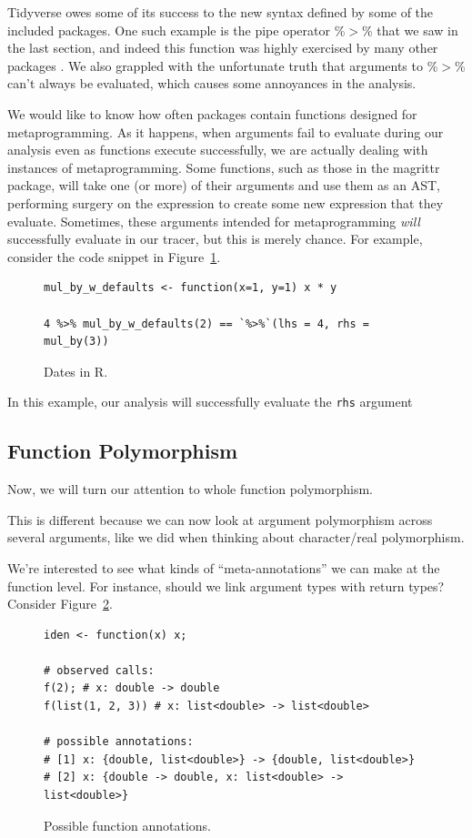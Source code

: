 \documentclass[acmsmall,10pt,review,anonymous]{acmart}\settopmatter{printfolios=true,printccs=false,printacmref=false}
\begin{document}

Tidyverse owes some of its success to the new syntax defined by some of the included packages.
One such example is the pipe operator \%$>$\% that we saw in the last section, and indeed this function was highly exercised by many other packages .
We also grappled with the unfortunate truth that arguments to \%$>$\% can't always be evaluated, which causes some annoyances in the analysis.

We would like to know how often packages contain functions designed for metaprogramming.
As it happens, when arguments fail to evaluate during our analysis even as functions execute successfully, we are actually dealing with instances of metaprogramming.
Some functions, such as those in the magrittr package, will take one (or more) of their arguments and use them as an AST, performing surgery on the expression to create some new expression that they evaluate.
Sometimes, these arguments intended for metaprogramming {\it will} successfully evaluate in our tracer, but this is merely chance.
For example, consider the code snippet in Figure~\ref{fig:metaexworks}.

\begin{figure}[!hb]{\small\begin{lstlisting}[style=R]
mul_by_w_defaults <- function(x=1, y=1) x * y

4 %>% mul_by_w_defaults(2) == `%>%`(lhs = 4, rhs = mul_by(3)) 
\end{lstlisting}}\caption{Dates in R.}\label{fig:metaexworks}\end{figure}

In this example, our analysis will successfully evaluate the {\tt rhs} argument 

%
%
%
%
\subsection{Function Polymorphism}

Now, we will turn our attention to whole function polymorphism.

This is different because we can now look at argument polymorphism across several arguments, like we did when thinking about character/real polymorphism.

We're interested to see what kinds of ``meta-annotations'' we can make at the function level.
For instance, should we link argument types with return types?
Consider Figure~\ref{fig:funanno}.
\begin{figure}[!hb]{\small\begin{lstlisting}[style=R]
iden <- function(x) x;

# observed calls:
f(2); # x: double -> double
f(list(1, 2, 3)) # x: list<double> -> list<double>

# possible annotations:
# [1] x: {double, list<double>} -> {double, list<double>}
# [2] x: {double -> double, x: list<double> -> list<double>}
\end{lstlisting}}\caption{Possible function annotations.}\label{fig:funanno}\end{figure}
\end{document}
